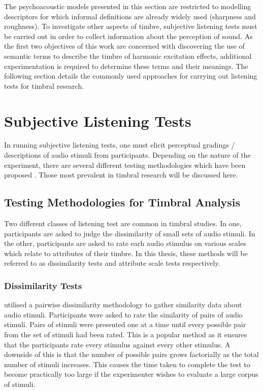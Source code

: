 		The psychoacoustic models presented in this section are restricted to modelling descriptors for which
		informal definitions are already widely used (sharpness and roughness). To investigate other aspects of
		timbre, subjective listening tests must be carried out in order to collect information about the perception
		of sound. As the first two objectives of this work are concerned with discovering the use of semantic terms
		to describe the timbre of harmonic excitation effects, additional experimentation is required to determine
		these terms and their meanings. The following section details the commonly used approaches for carrying out
		listening tests for timbral research.
		
\section{Subjective Listening Tests}
\label{sec:Timbre-ListeningTests}
	In running subjective listening tests, one must elicit perceptual gradings / descriptions of audio stimuli from
	participants. Depending on the nature of the experiment, there are several different testing methodologies which
	have been proposed \citep{bech2006perceptual}. Those most prevalent in timbral research will be discussed here.

	\subsection{Testing Methodologies for Timbral Analysis}
	\label{sec:Timbre-ListeningTests-Methods}
		Two different classes of listening test are common in timbral studies. In one, participants are asked to
		judge the dissimilarity of small sets of audio stimuli. In the other, participants are asked to rate each
		audio stimulus on various scales which relate to attributes of their timbre. In this thesis, these methods
		will be referred to as dissimilarity tests and attribute scale tests respectively.

		\subsubsection*{Dissimilarity Tests}
			\citet{grey1977multidimensional} utilised a pairwise dissimilarity methodology to gather similarity
			data about audio stimuli. Participants were asked to rate the similarity of pairs of audio stimuli.
			Pairs of stimuli were presented one at a time until every possible pair from the set of stimuli had
			been rated. This is a popular method as it ensures that the participants rate every stimulus
			against every other stimulus. A downside of this is that the number of possible pairs grows
			factorially as the total number of stimuli increases. This causes the time taken to complete the
			test to become practically too large if the experimenter wishes to evaluate a large corpus of
			stimuli.

